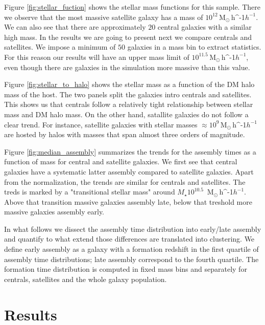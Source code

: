 \documentclass[fleqn,usenatbib]{mnras}
\newcommand{\Msunh}{\,{\rm M}$_{\odot}$\,\ifmmode h^{-1}\else $h^{-1}$\fi}
\begin{document}
Figure \ref{fig:stellar_fuction} shows the stellar mass functions for
this sample.
There we observe that the most massive satellite galaxy has a
mass of $10^{12}$\Msunh.  
We can also see that there are approximately $20$ central galaxies
with a similar high mass. 
In the results we are going to present next we compare centrals and
satellites. 
We impose a  minimum of $50$ galaxies in a mass bin to extract statistics. 
For this reason our results will have an upper mass limit of
$10^{11.5}$\Msunh, even though there are galaxies in the simulation
more massive than this value.

Figure \ref{fig:stellar_to_halo} shows the stellar mass as a function
of the DM halo mass of the host.
The two panels split the galaxies intro centrals and satellites. 
This shows us that centrals follow a relatively tight relationship
between stellar mass and DM halo mass.
On the other hand, satallite galaxies do not follow a clear trend.
For instance, satellite galaxies with stellar masses $\approx
10^{9}$\Msunh are hosted by halos with masses that span almost three
orders of magnitude.

Figure \ref{fig:median_assembly} summarizes the trends for the
assembly times as a function of mass for central and satellite
galaxies.
We first see that central galaxies have a systematic latter assembly
compared to satellite galaxies.
Apart from the normalization, the trends are similar for centrals and
satellites.
The treds is marked by a "transitional stellar mass" around $M_\star
10^{10.5}$ \Msunh.
Above that transition massive galaxies assembly late, below that
treshold more massive galaxies assembly early.

In what follows we dissect the assembly time distribution into
early/late assembly and quantify to what extend those differences are
translated into clustering.
We define early assembly as a galaxy with a formation redshift in the
first quartile of assembly time distributions; late
assembly correspond to the fourth quartile.
The formation time distribution is computed in fixed mass bins and
separately for centrals, satellites and the whole galaxy population. 


\section{Results}
\label{sec:galactic_prop}
\end{document}
